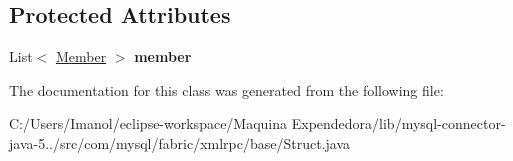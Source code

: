 \subsection*{Protected Attributes}
\begin{DoxyCompactItemize}
\item 
\mbox{\label{classcom_1_1mysql_1_1fabric_1_1xmlrpc_1_1base_1_1_struct_aa0c21493d7aff7a7107718c471a28f7e}} 
List$<$ \mbox{\hyperlink{classcom_1_1mysql_1_1fabric_1_1xmlrpc_1_1base_1_1_member}{Member}} $>$ {\bfseries member}
\end{DoxyCompactItemize}


The documentation for this class was generated from the following file\+:\begin{DoxyCompactItemize}
\item 
C\+:/\+Users/\+Imanol/eclipse-\/workspace/\+Maquina Expendedora/lib/mysql-\/connector-\/java-\/5../src/com/mysql/fabric/xmlrpc/base/Struct.\+java\end{DoxyCompactItemize}
